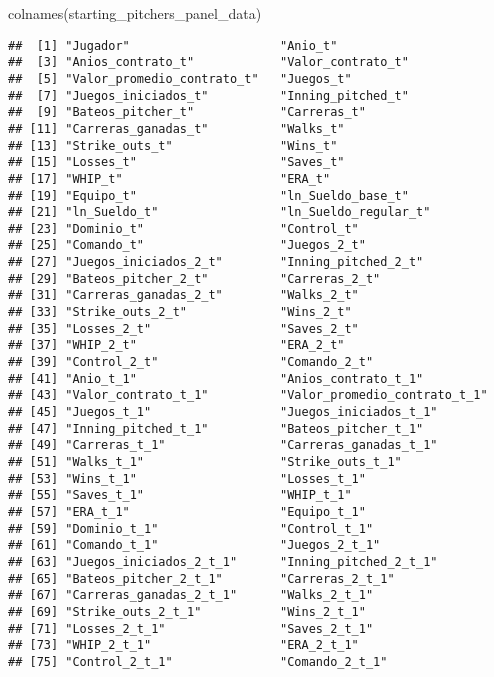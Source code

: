 \documentclass[
]{article}
\newenvironment{Shaded}{\begin{snugshade}}{\end{snugshade}}
\newcommand{\FunctionTok}[1]{\textcolor[rgb]{0.00,0.00,0.00}{#1}}
\newcommand{\NormalTok}[1]{#1}
\begin{document}
\begin{Shaded}
\begin{Highlighting}[]
\FunctionTok{colnames}\NormalTok{(starting\_pitchers\_panel\_data)}
\end{Highlighting}
\end{Shaded}

\begin{verbatim}
##  [1] "Jugador"                     "Anio_t"                     
##  [3] "Anios_contrato_t"            "Valor_contrato_t"           
##  [5] "Valor_promedio_contrato_t"   "Juegos_t"                   
##  [7] "Juegos_iniciados_t"          "Inning_pitched_t"           
##  [9] "Bateos_pitcher_t"            "Carreras_t"                 
## [11] "Carreras_ganadas_t"          "Walks_t"                    
## [13] "Strike_outs_t"               "Wins_t"                     
## [15] "Losses_t"                    "Saves_t"                    
## [17] "WHIP_t"                      "ERA_t"                      
## [19] "Equipo_t"                    "ln_Sueldo_base_t"           
## [21] "ln_Sueldo_t"                 "ln_Sueldo_regular_t"        
## [23] "Dominio_t"                   "Control_t"                  
## [25] "Comando_t"                   "Juegos_2_t"                 
## [27] "Juegos_iniciados_2_t"        "Inning_pitched_2_t"         
## [29] "Bateos_pitcher_2_t"          "Carreras_2_t"               
## [31] "Carreras_ganadas_2_t"        "Walks_2_t"                  
## [33] "Strike_outs_2_t"             "Wins_2_t"                   
## [35] "Losses_2_t"                  "Saves_2_t"                  
## [37] "WHIP_2_t"                    "ERA_2_t"                    
## [39] "Control_2_t"                 "Comando_2_t"                
## [41] "Anio_t_1"                    "Anios_contrato_t_1"         
## [43] "Valor_contrato_t_1"          "Valor_promedio_contrato_t_1"
## [45] "Juegos_t_1"                  "Juegos_iniciados_t_1"       
## [47] "Inning_pitched_t_1"          "Bateos_pitcher_t_1"         
## [49] "Carreras_t_1"                "Carreras_ganadas_t_1"       
## [51] "Walks_t_1"                   "Strike_outs_t_1"            
## [53] "Wins_t_1"                    "Losses_t_1"                 
## [55] "Saves_t_1"                   "WHIP_t_1"                   
## [57] "ERA_t_1"                     "Equipo_t_1"                 
## [59] "Dominio_t_1"                 "Control_t_1"                
## [61] "Comando_t_1"                 "Juegos_2_t_1"               
## [63] "Juegos_iniciados_2_t_1"      "Inning_pitched_2_t_1"       
## [65] "Bateos_pitcher_2_t_1"        "Carreras_2_t_1"             
## [67] "Carreras_ganadas_2_t_1"      "Walks_2_t_1"                
## [69] "Strike_outs_2_t_1"           "Wins_2_t_1"                 
## [71] "Losses_2_t_1"                "Saves_2_t_1"                
## [73] "WHIP_2_t_1"                  "ERA_2_t_1"                  
## [75] "Control_2_t_1"               "Comando_2_t_1"
\end{verbatim}
\end{document}
